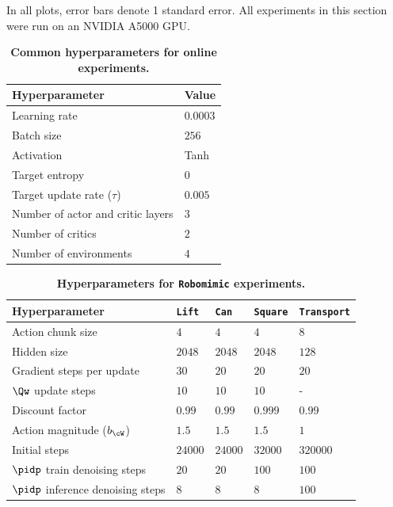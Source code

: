 In all plots, error bars denote 1 standard error.
All experiments in this section were run on an NVIDIA A5000 GPU.





\begin{table}[H]
\caption{
\footnotesize
\textbf{Common \algname hyperparameters for online experiments.}
}
\vspace{5pt}
\label{tab:dsrl_online_hyperparams}
\begin{center}
\scalebox{0.9}
{
\begin{tabular}{ll}
    \toprule
    \textbf{Hyperparameter} & \textbf{Value} \\
    \midrule
    Learning rate & $0.0003$ \\
    Batch size & $256$ \\
    Activation & Tanh \\
    Target entropy & $0$ \\
    Target update rate ($\tau$) & $0.005$ \\
    Number of actor and critic layers & $3$ \\
    Number of critics & $2$ \\
    Number of environments & $4$ \\
    \bottomrule
\end{tabular}
}
\end{center}
\end{table}



\begin{table}
\caption{
\footnotesize
\textbf{Hyperparameters for \algname \texttt{Robomimic} experiments.}
}
\vspace{5pt}
\begin{center}
\scalebox{0.9}
{
\begin{tabular}{lllll}
    \toprule
    \textbf{Hyperparameter} & \texttt{Lift} & \texttt{Can} & \texttt{Square} & \texttt{Transport}  \\
    \midrule
    Action chunk size & $4$ & $4$ & $4$ & $8$  \\
Hidden size & $2048$  & $2048$ & $2048$ & $128$  \\
Gradient steps per update & $30$ & $20$ & $20$ & $20$  \\
$\Qw$ update steps & $10$ & $10$ & $10$ & - \\
Discount factor & $0.99$ & $0.99$ & $0.999$ & $0.99$  \\
Action magnitude ($\actmag$) & $1.5$ & $1.5$ & $1.5$ & $1$  \\
Initial steps & $24000$ & $24000$ & $32000$ & $320000$ \\
$\pidp$ train denoising steps & $20$ & $20$ & $100$ & $100$ \\
$\pidp$ inference denoising steps & $8$ & $8$ & $8$ & $100$ \\
    \bottomrule
\end{tabular}
}
\end{center}
\end{table}




